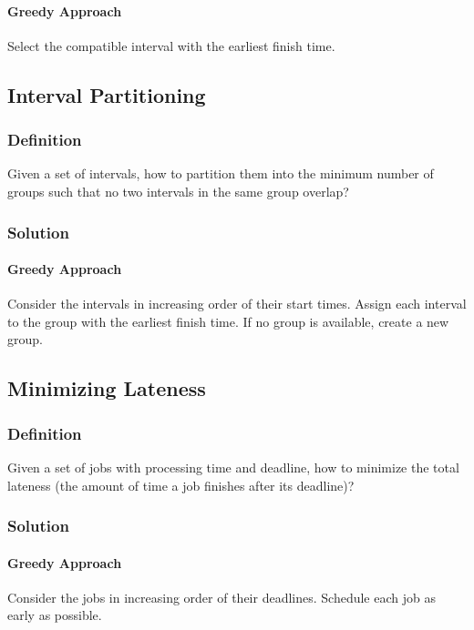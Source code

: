\documentclass[a4paper,12pt]{article}
\begin{document}
\paragraph{Greedy Approach} Select the compatible interval with the earliest finish time.

\subsection{Interval Partitioning}

\subsubsection{Definition}

Given a set of intervals, how to partition them into the minimum number of groups such that no two intervals in the same group overlap?

\subsubsection{Solution}

\paragraph{Greedy Approach} Consider the intervals in increasing order of their start times. Assign each interval to the group with the earliest finish time. If no group is available, create a new group.

\subsection{Minimizing Lateness}

\subsubsection{Definition}

Given a set of jobs with processing time and deadline, how to minimize the total lateness (the amount of time a job finishes after its deadline)?

\subsubsection{Solution}

\paragraph{Greedy Approach} Consider the jobs in increasing order of their deadlines. Schedule each job as early as possible.
\end{document}
